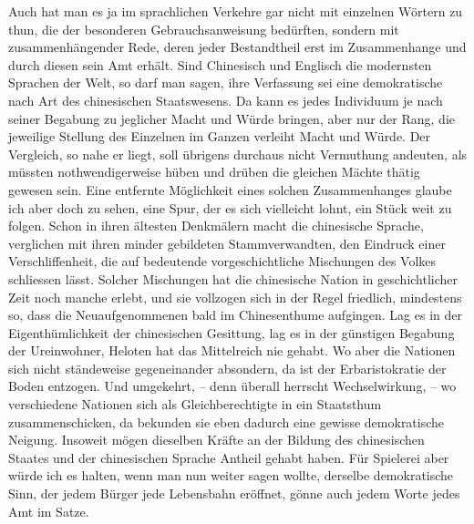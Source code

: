 \largerpage[-1]
Auch hat man es ja im sprachlichen Verkehre gar nicht mit einzelnen Wörtern zu thun, die der besonderen Gebrauchsanweisung bedürften, sondern mit zusammenhängender Rede, deren jeder Bestandtheil erst im Zusammenhange und durch diesen sein Amt erhält. Sind Chinesisch und Englisch die modernsten Sprachen der Welt, so darf man sagen, ihre Verfassung sei eine demokratische  nach Art des chinesischen Staatswesens. Da kann es jedes Individuum je nach seiner Begabung zu jeglicher Macht und Würde bringen, aber nur der Rang, die jeweilige Stellung des Einzelnen im Ganzen verleiht Macht und Würde. Der Vergleich, so nahe er liegt, soll übrigens durchaus nicht  Vermuthung andeuten, als müssten nothwendigerweise hüben und drüben die gleichen Mächte thätig gewesen sein. Eine entfernte Möglichkeit eines solchen Zusammenhanges glaube ich aber doch zu sehen, eine Spur, der es sich vielleicht lohnt, ein Stück weit zu folgen. Schon \label{fp.420} in ihren ältesten Denkmälern macht die chinesische Sprache, verglichen mit ihren minder gebildeten Stammverwandten, den Eindruck einer Verschliffenheit, die auf bedeutende vorgeschichtliche Mischungen des Volkes schliessen lässt. Solcher Mischungen hat die chinesische Nation in geschichtlicher Zeit noch manche erlebt, und sie vollzogen sich in der Regel friedlich, mindestens so, dass die Neuaufgenommenen bald im Chinesenthume aufgingen. Lag es in der Eigenthümlichkeit der chinesischen Gesittung, lag es in der günstigen Begabung der Ureinwohner, Heloten hat das Mittelreich nie gehabt. Wo aber die Nationen sich nicht ständeweise gegeneinander absondern, da ist der Erbaristokratie der Boden entzogen. Und umgekehrt, – denn überall herrscht Wechselwirkung, – wo verschiedene Nationen sich als Gleichberechtigte in ein Staatsthum zusammenschicken, da bekunden sie eben dadurch eine gewisse demokratische Neigung. \label{sp.441} Insoweit mögen dieselben Kräfte an der Bildung des chinesischen Staates und der chinesischen Sprache Antheil gehabt haben. Für Spielerei aber würde ich es halten, wenn man nun weiter sagen wollte, derselbe demokratische Sinn, der jedem Bürger jede Lebensbahn eröffnet, gönne auch jedem Worte jedes Amt im Satze.

